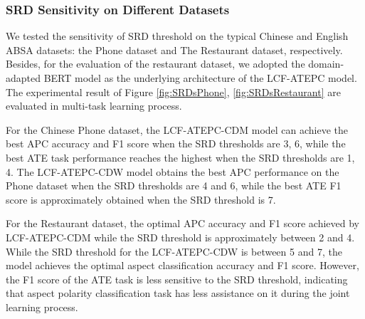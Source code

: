 \documentclass[a4paper,fleqn]{cas-sc}
\begin{document}
\subsubsection{SRD Sensitivity on Different Datasets}

We tested the sensitivity of SRD threshold on the typical Chinese and English ABSA datasets: the Phone dataset and The Restaurant dataset, respectively. Besides, for the evaluation of the restaurant dataset, we adopted the domain-adapted BERT model as the underlying architecture of the LCF-ATEPC model. The experimental result of Figure \ref{fig:SRDsPhone}, \ref{fig:SRDsRestaurant} are evaluated in multi-task learning process.

\begin{figure*}[pos=th]
	\centering

	\caption{The \ref{fig:subfiga}, \ref{fig:subfigb} are the performance visualization of LCF-ATEPC-CDM and LCF-ATEPC-CDW on the Chinese Phone dataset under different SRDs, respectively.}
	\label{fig:SRDsPhone}
\end{figure*}

For the Chinese Phone dataset, the LCF-ATEPC-CDM model can achieve the best APC accuracy and F1 score when the SRD thresholds are 3, 6, while the best ATE task performance reaches the highest when the SRD thresholds are 1, 4. The LCF-ATEPC-CDW model obtains the best APC performance on the Phone dataset when the SRD thresholds are 4 and 6, while the best ATE F1 score is approximately obtained when the SRD threshold is 7.

For the Restaurant dataset, the optimal APC accuracy and F1 score achieved by LCF-ATEPC-CDM while the SRD threshold is approximately between 2 and 4. While the SRD threshold for the LCF-ATEPC-CDW is between 5 and 7, the model achieves the optimal aspect classification accuracy and F1 score. However, the F1 score of the ATE task is less sensitive to the SRD threshold, indicating that aspect polarity classification task has less assistance on it during the joint learning process.

\begin{figure*}[pos=th]
	\centering
	\caption{The \ref{fig:subfigc}, \ref{fig:subfigd} are the performance visualization of LCF-ATEPC-CDM and LCF-ATEPC-CDW on the Restaurant dataset under different SRDs, respectively.}
	\label{fig:SRDsRestaurant}
\end{figure*}
\end{document}
